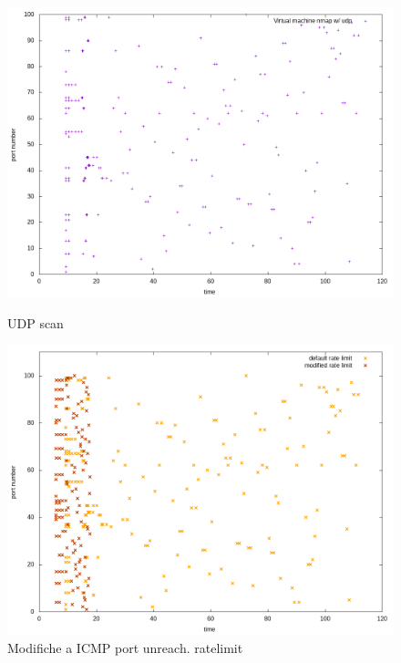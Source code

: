 \documentclass{article}
\begin{document}
 \begin{figure}[!htb]
  \begin{minipage}{0.49\textwidth}
    \centering
    \includegraphics[width=1\linewidth]{vm_udp.png}
    \vspace{-10pt}
    \caption{UDP scan}\label{Fig:tcp2}
  \end{minipage}\hfill
  \begin{minipage}{0.49\textwidth}
    \centering
    \includegraphics[width=1\textwidth]{ratelimit.png}
    \vspace{-10pt}
    \caption{Modifiche a ICMP port unreach. ratelimit}\label{Fig:ratelimit}
    
  \end{minipage}
\end{figure}
\end{document}
